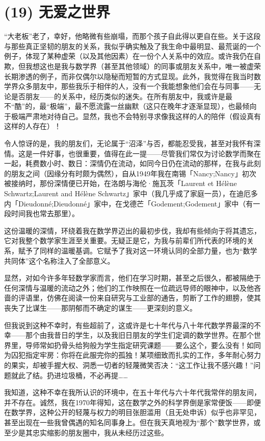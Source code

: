 \section{(19) 无爱之世界}

“大老板”老了，幸好，他略微有些崩塌，而那个孩子自此得以更自在些。关于这段与那些真正坚韧的朋友的关系，我似乎确实触及了我生命中最明显、最荒诞的一个例子，体现了某种虚荣（以及其他因素）在一份个人关系中的效应。或许我仍在自欺，但我想这也是我与数学界（甚至其他领域）的同事或朋友关系中，唯一被虚荣长期渗透的例子，而非仅偶尔以隐秘而短暂的方式显现。此外，我觉得在我当时数学界众多朋友中，那些我乐于相伴的人，没有一个我能想象他们会在与同事——无论是否朋友——的关系中，经历类似的迷失。在所有朋友中，我或许是最不“酷”的，最“极端”，最不愿流露一丝幽默（这只在晚年才逐渐显现），也最倾向于极端严肃地对待自己。显然，我也不会特别寻求像我这样的人的陪伴（假设真有这样的人存在）！

令人惊讶的是，我的朋友们，无论属于“沼泽”与否，都能忍受我，甚至对我怀有深情。这是一件好事，也很重要，值得在此一提——尽管我们常仅为讨论数学而聚在一起，耗费数小时、数日：深情仍在流动，如同今日仍在流动的那样，在我与此刻的朋友之间（因缘分有时颇为偶然），自从1949年我在南锡「Nancy;Nancy」初次被接纳时，那份深情便已开始，在洛朗与海伦·施瓦茨「Laurent et Hélène Schwartz;Laurent and Hélène Schwartz」家中（我几乎成了家庭一员），在迪厄多内「Dieudonné;Dieudonné」家中，在戈德芒「Godement;Godement」家中（有一段时间我也常去那里）。

这份温暖的深情，环绕着我在数学界迈出的最初步伐，我却有些倾向于将其遗忘，它对我整个数学家生涯至关重要。无疑正是它，为我与前辈们所代表的环境的关系，赋予了同样的温暖基调。它赋予了我对这一环境认同的全部力量，也为“数学共同体”这个名称注入了全部意义。

显然，对如今许多年轻数学家而言，他们在学习时期，甚至之后很久，都被隔绝于任何深情与温暖的流动之外；他们的工作映照在一位疏远导师的眼神中，以及他吝啬的评语里，仿佛在阅读一份来自研究与工业部的通告，剪断了工作的翅膀，使其丧失了比谋生——那阴郁而不确定的谋生——更深刻的意义。

但我说到这种不幸时，有些超前了，这或许是七十年代与八十年代数学界最深的不幸——那个由我昔日的学生，以及我旧日朋友的学生们定调的数学世界。在那个世界里，导师常如扔骨头给狗般为学生指定研究课题——要么这个，要么没有！如同为囚犯指定牢房：你将在此服完你的孤独！某项细致而扎实的工作，多年耐心努力的果实，却被手握大权、洞悉一切者的轻蔑微笑否决：“这工作让我不感兴趣！”问题就此了结。扔进垃圾桶，不必再提……

我知道，这种不幸在我所认识的环境中，在五十年代与六十年代我常伴的朋友间，并不存在。诚然，我在1970年得知，这在数学之外的科学界倒是家常便饭——即便在数学界，这种公开的轻蔑与权力的明目张胆滥用（且无处申诉）似乎也非罕见，甚至出现在一些我曾偶遇的知名同事身上。但在我天真地视为“那个”数学世界，或至少是其忠实缩影的朋友圈中，我从未经历过这些。

